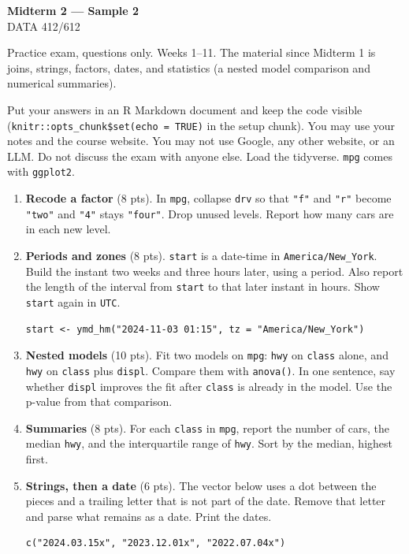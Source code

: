 \documentclass[11pt]{article}
\begin{document}
\begin{center}
{\LARGE\bfseries Midterm 2 --- Sample 2}\\[0.35em]
DATA 412/612
\end{center}

\vspace{0.2em}

Practice exam, questions only. Weeks 1--11. The material since
Midterm 1 is joins, strings, factors, dates, and statistics
(a nested model comparison and numerical summaries).

Put your answers in an R Markdown document and keep the code visible
(\texttt{knitr::opts\_chunk\$set(echo = TRUE)} in the setup chunk).
You may use your notes and the course website.
You may not use Google, any other website, or an LLM.
Do not discuss the exam with anyone else.
Load the tidyverse. \texttt{mpg} comes with \texttt{ggplot2}.

\begin{enumerate}
\item \textbf{Recode a factor} (8 pts).
In \texttt{mpg}, collapse \texttt{drv} so that \texttt{"f"} and
\texttt{"r"} become \texttt{"two"} and \texttt{"4"} stays
\texttt{"four"}.
Drop unused levels. Report how many cars are in each new level.

\item \textbf{Periods and zones} (8 pts).
\texttt{start} is a date-time in \texttt{America/New\_York}.
Build the instant two weeks and three hours later, using a period.
Also report the length of the interval from \texttt{start} to that
later instant in hours.
Show \texttt{start} again in \texttt{UTC}.

\begin{lstlisting}
start <- ymd_hm("2024-11-03 01:15", tz = "America/New_York")
\end{lstlisting}

\item \textbf{Nested models} (10 pts).
Fit two models on \texttt{mpg}: \texttt{hwy} on \texttt{class} alone,
and \texttt{hwy} on \texttt{class} plus \texttt{displ}.
Compare them with \texttt{anova()}.
In one sentence, say whether \texttt{displ} improves the fit after
\texttt{class} is already in the model. Use the p-value from that
comparison.

\item \textbf{Summaries} (8 pts).
For each \texttt{class} in \texttt{mpg}, report the number of cars,
the median \texttt{hwy}, and the interquartile range of \texttt{hwy}.
Sort by the median, highest first.

\item \textbf{Strings, then a date} (6 pts).
The vector below uses a dot between the pieces and a trailing
letter that is not part of the date.
Remove that letter and parse what remains as a date.
Print the dates.

\begin{lstlisting}
c("2024.03.15x", "2023.12.01x", "2022.07.04x")
\end{lstlisting}
\end{enumerate}
\end{document}
